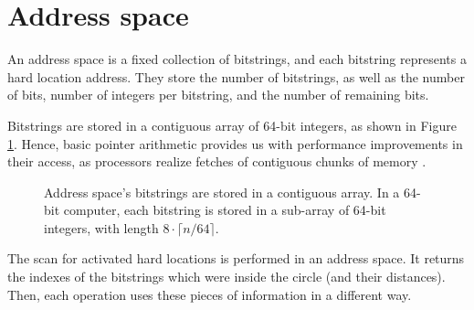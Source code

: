 \section{Address space}

An address space is a fixed collection of bitstrings, and each bitstring represents a hard location address. They store the number of bitstrings, as well as the number of bits, number of integers per bitstring, and the number of remaining bits.

Bitstrings are stored in a contiguous array of 64-bit integers, as shown in Figure \ref{tab:hl-addresses-detail}. Hence, basic pointer arithmetic provides us with performance improvements in their access, as processors realize fetches of contiguous chunks of memory  \citep{pai2004linux}.

\begin{figure}
\centering
{}

\caption{Address space's bitstrings are stored in a contiguous array. In a 64-bit computer, each bitstring is stored in a sub-array of 64-bit integers, with length $8 \cdot \lceil n/64 \rceil$.\label{tab:hl-addresses-detail}}
\end{figure}

The scan for activated hard locations is performed in an address space. It returns the indexes of the bitstrings which were inside the circle (and their distances). Then, each operation uses these pieces of information in a different way.

